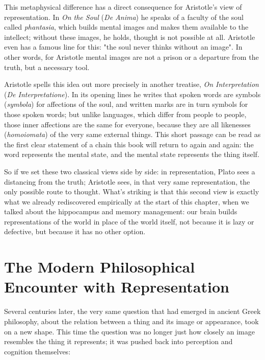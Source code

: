 This metaphysical difference has a direct consequence for Aristotle's view of representation. In \textit{On the Soul} (\textit{De Anima}) he speaks of a faculty of the soul called \textit{phantasia}, which builds mental images and makes them available to the intellect; without these images, he holds, thought is not possible at all. Aristotle even has a famous line for this: "the soul never thinks without an image"\autocite{aristotle-deanima}. In other words, for Aristotle mental images are not a prison or a departure from the truth, but a necessary tool.

Aristotle spells this idea out more precisely in another treatise, \textit{On Interpretation} (\textit{De Interpretatione}). In its opening lines he writes that spoken words are symbols (\textit{symbola}) for affections of the soul, and written marks are in turn symbols for those spoken words; but unlike languages, which differ from people to people, those inner affections are the same for everyone, because they are all likenesses (\textit{homoiomata}) of the very same external things\autocite{aristotle-deinterpretatione}. This short passage can be read as the first clear statement of a chain this book will return to again and again: the word represents the mental state, and the mental state represents the thing itself.

So if we set these two classical views side by side: in representation, Plato sees a distancing from the truth; Aristotle sees, in that very same representation, the only possible route to thought. What's striking is that this second view is exactly what we already rediscovered empirically at the start of this chapter, when we talked about the hippocampus and memory management: our brain builds representations of the world in place of the world itself, not because it is lazy or defective, but because it has no other option.

\newpage
\section{The Modern Philosophical Encounter with Representation}
\label{sec:modern-encounter}

Several centuries later, the very same question that had emerged in ancient Greek philosophy, about the relation between a thing and its image or appearance, took on a new shape. This time the question was no longer just how closely an image resembles the thing it represents; it was pushed back into perception and cognition themselves:

